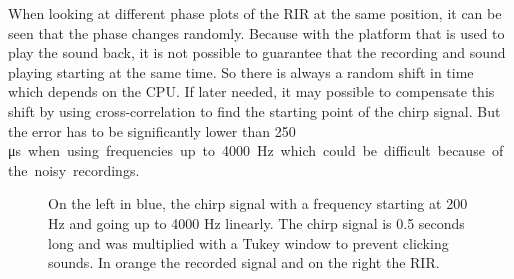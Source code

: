 When looking at different phase plots of the RIR at the same position, it can be seen that the phase changes randomly. Because with the platform that is used to play the sound back, it is not possible to guarantee that the recording and sound playing starting at the same time. So there is always a random shift in time which depends on the CPU. If later needed, it may possible to compensate this shift by using cross-correlation to find the starting point of the chirp signal. But the error has to be significantly lower than 250 \si\micro s when using frequencies up to 4000 Hz which could be difficult because of the noisy recordings.

\begin{figure}[h!]
	\centering
	\captionsetup{justification=centering,margin=1cm}	
	\caption{
		On the left in blue, the chirp signal with a frequency starting at 200 Hz and going up to 4000 Hz linearly. The chirp signal is 0.5 seconds long and was multiplied with a Tukey window to prevent clicking sounds. In orange the recorded signal and on the right the RIR.
	}
	\label{fig:signal_response_example}
\end{figure}


